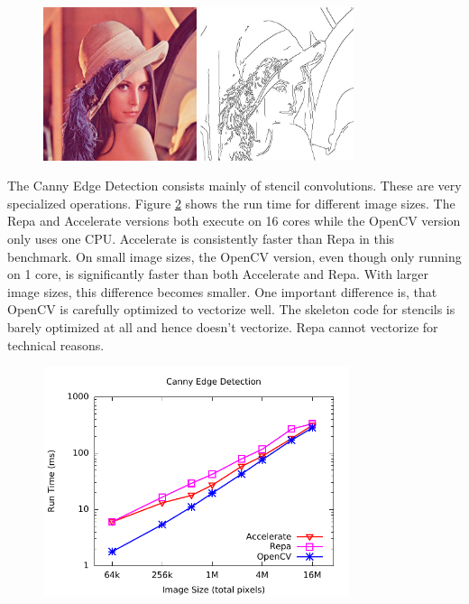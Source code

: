 \documentclass[a4paper,bibliography=totocnumbered,parskip,headsepline]{scrbook}
\begin{document}
\begin{figure}
    \centering
    \includegraphics[width=0.4\textwidth]{images/benchmarks/canny/lena}
    \includegraphics[width=0.4\textwidth]{images/benchmarks/canny/lena-edges}
    \label{fig:lena}
\end{figure}

The Canny Edge Detection consists mainly of stencil convolutions.
These are very specialized operations.
Figure \ref{fig:canny} shows the run time for different image sizes.
The Repa and Accelerate versions both execute on 16 cores while the OpenCV version only uses one CPU.
Accelerate is consistently faster than Repa in this benchmark.
On small image sizes, the OpenCV version, even though only running on 1 core, is significantly faster than both Accelerate and Repa.
With larger image sizes, this difference becomes smaller.
One important difference is, that OpenCV is carefully optimized to vectorize well.
The skeleton code for stencils is barely optimized at all and hence doesn't vectorize.
Repa cannot vectorize for technical reasons.\cite{lippmeier2012efficient}

\begin{figure}
    \centering
    \includegraphics[width=0.8\textwidth]{images/benchmarks/canny/canny}
    \label{fig:canny}
\end{figure}
\end{document}
